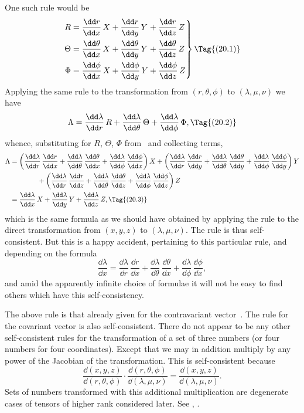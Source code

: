 \documentclass[12pt]{book}
\begin{document}
One such rule would be
\[
\left.
\begin{alignedat}{3}
  R &= \frac{\dd r}{\dd x}\, X &&+ \frac{\dd r}{\dd y}\, Y &&+ \frac{\dd r}{\dd z}\, Z \\
  \Theta &= \frac{\dd \theta}{\dd x}\, X &&+ \frac{\dd \theta}{\dd y}\, Y &&+ \frac{\dd \theta}{\dd z}\, Z \\
  \Phi &= \frac{\dd \phi}{\dd x}\, X &&+ \frac{\dd \phi}{\dd y}\, Y &&+ \frac{\dd \phi}{\dd z}\, Z
  \end{alignedat}\right\}
\Tag{(20.1)}
\]
Applying the same rule to the transformation from $(r, \theta, \phi)$ to $(\lambda, \mu, \nu)$
we have
\[
\Lambda = \frac{\dd \lambda}{\dd r}\, R + \frac{\dd \lambda}{\dd \theta}\, \Theta + \frac{\dd \lambda}{\dd \phi}\, \Phi,
\Tag{(20.2)}
\]
whence, substituting for $R$, $\Theta$, $\Phi$ from~ and collecting terms,
\begin{align*}
  \Lambda &= \left(\frac{\dd \lambda}{\dd r}\, \frac{\dd r}{\dd x} + \frac{\dd \lambda}{\dd \theta}\, \frac{\dd \theta}{\dd x} + \frac{\dd \lambda}{\dd \phi}\, \frac{\dd \phi}{\dd x}\right) X
  + \left(\frac{\dd \lambda}{\dd r}\, \frac{\dd r}{\dd y} + \frac{\dd \lambda}{\dd \theta}\, \frac{\dd \theta}{\dd y} + \frac{\dd \lambda}{\dd \phi}\, \frac{\dd \phi}{\dd y}\right) Y \\
  &\qquad\qquad+ \left(\frac{\dd \lambda}{\dd r}\, \frac{\dd r}{\dd z} + \frac{\dd \lambda}{\dd \theta}\, \frac{\dd \theta}{\dd z} + \frac{\dd \lambda}{\dd \phi}\, \frac{\dd \phi}{\dd z}\right) Z \\
  &= \frac{\dd\lambda}{\dd x}\, X + \frac{\dd\lambda}{\dd y}\, Y + \frac{\dd\lambda}{\dd z}\, Z,
  \Tag{(20.3)}
\end{align*}
which is the same formula as we should have obtained by applying the rule
to the direct transformation from $(x, y, z)$ to $(\lambda, \mu, \nu)$. The rule is thus self\hyp{}consistent.
But this is a happy accident, pertaining to this particular rule,
and depending on the formula
\[
\frac{\dd\lambda}{\dd x}
= \frac{\dd \lambda}{\dd r}\, \frac{\dd r}{\dd x}
+ \frac{\dd \lambda}{\dd \theta}\, \frac{\dd \theta}{\dd x}
+ \frac{\dd \lambda}{\dd \phi}\, \frac{\dd \phi}{\dd x},
\]
and amid the apparently infinite choice of formulae it will not be easy to find
others which have this self\hyp{}consistency.

The above rule is that already given for the contravariant vector~.
The rule for the covariant vector is also self\hyp{}consistent. There do not appear
to be any other self\hyp{}consistent rules for the transformation of a set of three
numbers (or four numbers for four coordinates)\footnotemark.\footnotetext
  {Except that we may in addition multiply by any power of the Jacobian of the transformation.
  This is self\hyp{}consistent because
  \[
  \frac{\dd(x, y, z)}{\dd(r, \theta, \phi)} \cdot \frac{\dd(r, \theta, \phi)}{\dd(\lambda, \mu, \nu)}
  = \frac{\dd(x, y, z)}{\dd(\lambda, \mu, \nu)}.
  \]
  Sets of numbers transformed with this additional multiplication are degenerate cases of tensors
  of higher rank considered later. See , .}
\end{document}

